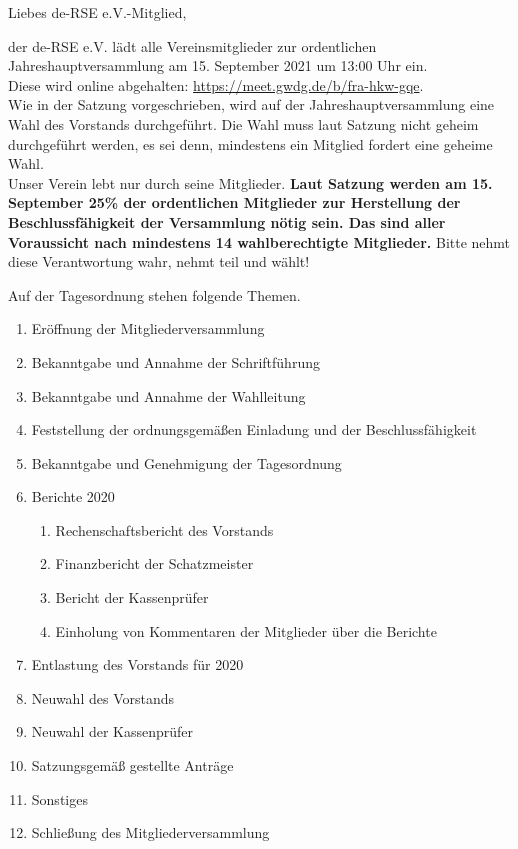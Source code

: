 \documentclass[../Vorlagen/de-RSE_Brief,a4paper,addrfield=no]{scrlttr2}
\begin{document}


\begin{letter}{\mbox{}
}
\opening{Liebes de-RSE e.V.-Mitglied,}

der de-RSE e.V. lädt alle Vereinsmitglieder zur ordentlichen Jahreshauptversammlung am 15. September 2021 um 13:00 Uhr ein.\\

Diese wird online abgehalten: \href{https://meet.gwdg.de/b/fra-hkw-gqe}{https://meet.gwdg.de/b/fra-hkw-gqe}.\\

Wie in der Satzung vorgeschrieben, wird auf der Jahreshauptversammlung eine Wahl des Vorstands durchgeführt.
Die Wahl muss laut Satzung nicht geheim durchgeführt werden, es sei denn, mindestens ein Mitglied fordert eine geheime Wahl.\\

Unser Verein lebt nur durch seine Mitglieder.
\textbf{Laut Satzung werden am 15. September 25\% der ordentlichen Mitglieder zur Herstellung der Beschlussfähigkeit der Versammlung nötig sein. Das sind aller Voraussicht nach mindestens 14 wahlberechtigte Mitglieder.}
Bitte nehmt diese Verantwortung wahr, nehmt teil und wählt!

\clearpage
\vspace{2em}
Auf der Tagesordnung stehen folgende Themen.
\begin{enumerate}
\setlength\itemsep{0em}
\item Eröffnung der Mitgliederversammlung
\item Bekanntgabe und Annahme der Schriftführung
\item Bekanntgabe und Annahme der Wahlleitung
\item Feststellung der ordnungsgemäßen Einladung und der Beschlussfähigkeit
\item Bekanntgabe und Genehmigung der Tagesordnung
\item Berichte 2020
\begin{enumerate}
 \item Rechenschaftsbericht des Vorstands
 \item Finanzbericht der Schatzmeister
 \item Bericht der Kassenprüfer
 \item Einholung von Kommentaren der Mitglieder über die Berichte
\end{enumerate}
\item Entlastung des Vorstands für 2020
\item Neuwahl des Vorstands
\item Neuwahl der Kassenprüfer
\item Satzungsgemäß gestellte Anträge
\item Sonstiges
\item Schließung des Mitgliederversammlung
\end{enumerate}


\end{letter}
\end{document}
